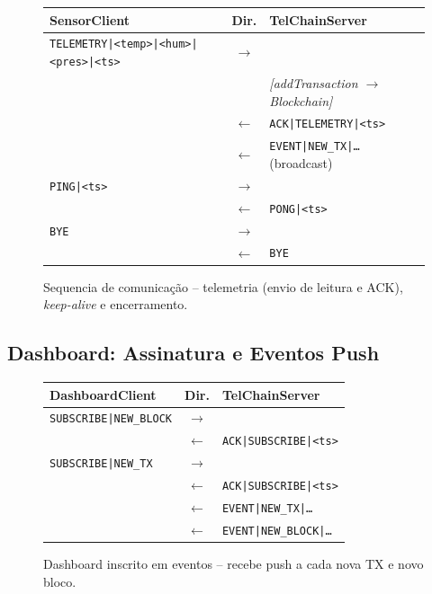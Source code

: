 \documentclass[12pt, a4paper]{article}
\begin{document}
\begin{figure}[H]
\centering
\begin{tabular}{p{5cm} c p{5.5cm}}
\toprule
\textbf{SensorClient} & \textbf{Dir.} & \textbf{TelChainServer} \\
\midrule
\texttt{TELEMETRY|<temp>|<hum>|} \newline \texttt{<pres>|<ts>} & $\longrightarrow$ & \\
 & & \textit{[addTransaction $\to$ Blockchain]} \\
 & $\longleftarrow$ & \texttt{ACK|TELEMETRY|<ts>} \\
 & $\longleftarrow$ & \texttt{EVENT|NEW\_TX|\ldots} (broadcast) \\
\midrule
\texttt{PING|<ts>} & $\longrightarrow$ & \\
 & $\longleftarrow$ & \texttt{PONG|<ts>} \\
\midrule
\texttt{BYE} & $\longrightarrow$ & \\
 & $\longleftarrow$ & \texttt{BYE} \\
\bottomrule
\end{tabular}
\caption{Sequencia de comunicação -- telemetria (envio de leitura e ACK), \emph{keep-alive} e encerramento.}
\label{fig:seq-sensor}
\end{figure}

\subsection{Dashboard: Assinatura e Eventos Push}

\begin{figure}[H]
\centering
\begin{tabular}{p{5cm} c p{5.5cm}}
\toprule
\textbf{DashboardClient} & \textbf{Dir.} & \textbf{TelChainServer} \\
\midrule
\texttt{SUBSCRIBE|NEW\_BLOCK} & $\longrightarrow$ & \\
 & $\longleftarrow$ & \texttt{ACK|SUBSCRIBE|<ts>} \\
\texttt{SUBSCRIBE|NEW\_TX} & $\longrightarrow$ & \\
 & $\longleftarrow$ & \texttt{ACK|SUBSCRIBE|<ts>} \\
\midrule
 & $\longleftarrow$ & \texttt{EVENT|NEW\_TX|\ldots} \\
 & $\longleftarrow$ & \texttt{EVENT|NEW\_BLOCK|\ldots} \\
\bottomrule
\end{tabular}
\caption{Dashboard inscrito em eventos -- recebe push a cada nova TX e novo bloco.}
\label{fig:seq-push}
\end{figure}
\end{document}
